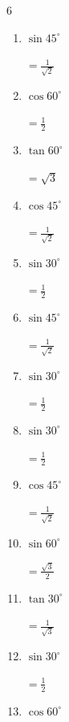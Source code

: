 \begin{multicols}{6}
\begin{enumerate}
        $\displaystyle =\frac{1}{\sqrt{3}}$

  \item $\displaystyle \sin{45^\circ}$

        $\displaystyle =\frac{1}{\sqrt{2}}$

  \item $\displaystyle \cos{60^\circ}$

        $\displaystyle =\frac{1}{2}$

  \item $\displaystyle \tan{60^\circ}$

        $\displaystyle =\sqrt{3}$

  \item $\displaystyle \cos{45^\circ}$

        $\displaystyle =\frac{1}{\sqrt{2}}$

  \item $\displaystyle \sin{30^\circ}$

        $\displaystyle =\frac{1}{2}$

  \item $\displaystyle \sin{45^\circ}$

        $\displaystyle =\frac{1}{\sqrt{2}}$

\columnbreak %

  \item $\displaystyle \sin{30^\circ}$

        $\displaystyle =\frac{1}{2}$

  \item $\displaystyle \sin{30^\circ}$

        $\displaystyle =\frac{1}{2}$

  \item $\displaystyle \cos{45^\circ}$

        $\displaystyle =\frac{1}{\sqrt{2}}$

  \item $\displaystyle \sin{60^\circ}$

        $\displaystyle =\frac{\sqrt{3}}{2}$

  \item $\displaystyle \tan{30^\circ}$

        $\displaystyle =\frac{1}{\sqrt{3}}$

  \item $\displaystyle \sin{30^\circ}$

        $\displaystyle =\frac{1}{2}$

  \item $\displaystyle \cos{60^\circ}$


\end{enumerate}
\end{multicols}
